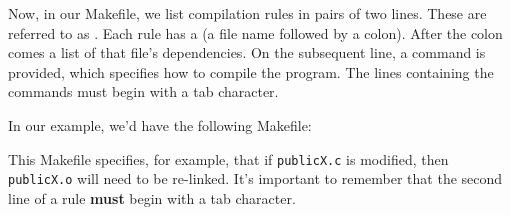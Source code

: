 Now, in our Makefile, we list compilation rules in pairs of two lines. These are referred to as . Each rule has a  (a file name followed by a colon). After the colon comes a list of that file's dependencies. On the subsequent line, a command is provided, which specifies how to compile the program. The lines containing the commands must begin with a tab character.

In our example, we'd have the following Makefile:

\lstset{
caption=Makefile 1
}
\begin{center}
\label{pointers:0601}
\end{center}

This Makefile specifies, for example, that if \verb!publicX.c! is modified, then \verb!publicX.o! will need to be re-linked. It's important to remember that the second line of a rule \textbf{must} begin with a tab character. 